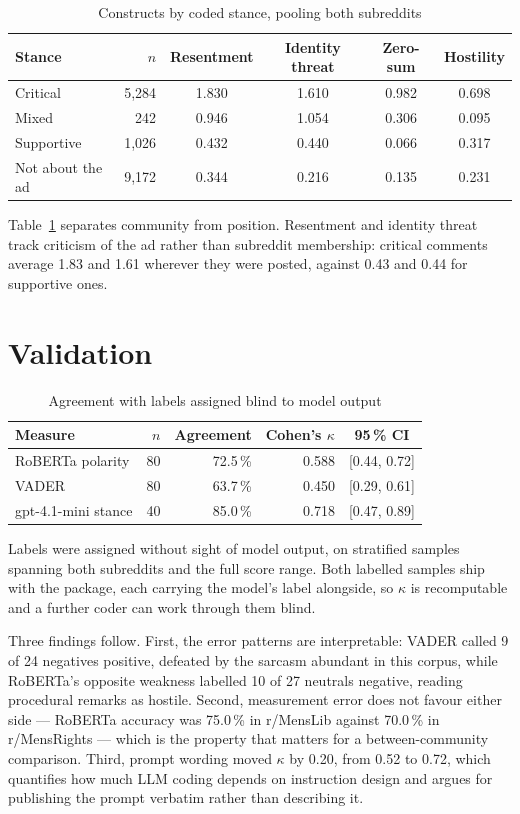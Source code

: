\documentclass[11pt,a4paper]{article}
\begin{document}
\begin{table}[h]
\centering\small
\caption{Constructs by coded stance, pooling both subreddits}\label{tab:bystance}
\begin{tabular}{lrcccc}
\toprule
Stance & $n$ & Resentment & Identity threat & Zero-sum & Hostility \\
\midrule
Critical         & 5{,}284 & 1.830 & 1.610 & 0.982 & 0.698 \\
Mixed            & 242     & 0.946 & 1.054 & 0.306 & 0.095 \\
Supportive       & 1{,}026 & 0.432 & 0.440 & 0.066 & 0.317 \\
Not about the ad & 9{,}172 & 0.344 & 0.216 & 0.135 & 0.231 \\
\bottomrule
\end{tabular}
\end{table}

Table~\ref{tab:bystance} separates community from position. Resentment and identity threat track criticism of the
ad rather than subreddit membership: critical comments average 1.83 and 1.61 wherever they were
posted, against 0.43 and 0.44 for supportive ones.

\section{Validation}

\begin{table}[h]
\centering\small
\caption{Agreement with labels assigned blind to model output}\label{tab:kappa}
\begin{tabular}{lrrrc}
\toprule
Measure & $n$ & Agreement & Cohen's $\kappa$ & 95\,\% CI \\
\midrule
RoBERTa polarity    & 80 & 72.5\,\% & 0.588 & [0.44, 0.72] \\
VADER               & 80 & 63.7\,\% & 0.450 & [0.29, 0.61] \\
gpt-4.1-mini stance & 40 & 85.0\,\% & 0.718 & [0.47, 0.89] \\
\bottomrule
\end{tabular}
\end{table}

Labels were assigned without sight of model output, on stratified samples spanning both subreddits
and the full score range. Both labelled samples ship with the package, each carrying the model's
label alongside, so $\kappa$ is recomputable and a further coder can work through them blind.

Three findings follow. First, the error patterns are interpretable: VADER called 9 of 24 negatives
positive, defeated by the sarcasm abundant in this corpus, while RoBERTa's opposite weakness
labelled 10 of 27 neutrals negative, reading procedural remarks as hostile. Second, measurement
error does not favour either side --- RoBERTa accuracy was 75.0\,\% in r/MensLib against 70.0\,\% in
r/MensRights --- which is the property that matters for a between-community comparison. Third,
prompt wording moved $\kappa$ by 0.20, from 0.52 to 0.72, which quantifies how much LLM coding
depends on instruction design and argues for publishing the prompt verbatim rather than describing
it.
\end{document}
